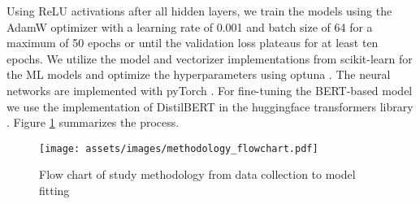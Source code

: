 Using ReLU activations after all hidden layers, we train the models using the AdamW optimizer  with a learning rate of 0.001 and batch size of 64 for a maximum of 50 epochs or until the validation loss plateaus for at least ten epochs.
We utilize the model and vectorizer implementations from scikit-learn  for the ML models and optimize the hyperparameters using optuna . The neural networks are implemented with pyTorch . For fine-tuning the BERT-based model we use the implementation of DistilBERT  in the huggingface transformers library . Figure \ref{figure-methodology-flowchart} summarizes the process.

\begin{figure}[!ht]
	\texttt{[image: assets/images/methodology\_flowchart.pdf]}	
	\caption{Flow chart of study methodology from data collection to model fitting}
	\label{figure-methodology-flowchart}
\end{figure}







